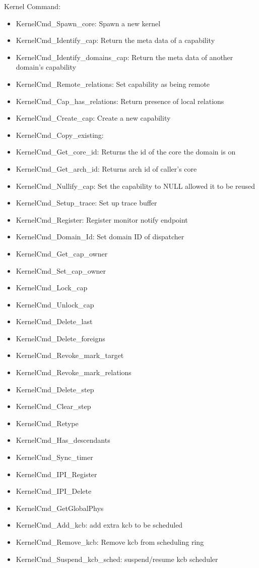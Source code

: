 \documentclass[a4paper,11pt,twoside]{report}
\begin{document}
{{Kernel Command:
\begin{itemize}
\item KernelCmd\_Spawn\_core: Spawn a new kernel
\item KernelCmd\_Identify\_cap: Return the meta data of a capability
\item KernelCmd\_Identify\_domains\_cap: Return the meta data of another domain's capability
\item KernelCmd\_Remote\_relations: Set capability as being remote
\item KernelCmd\_Cap\_has\_relations: Return presence of local relations
\item KernelCmd\_Create\_cap: Create a new capability
\item KernelCmd\_Copy\_existing:
\item KernelCmd\_Get\_core\_id: Returns the id of the core the domain is on
\item KernelCmd\_Get\_arch\_id: Returns arch id of caller's core
\item KernelCmd\_Nullify\_cap: Set the capability to NULL allowed it to be reused
\item KernelCmd\_Setup\_trace: Set up trace buffer
\item KernelCmd\_Register: Register monitor notify endpoint
\item KernelCmd\_Domain\_Id: Set domain ID of dispatcher
\item KernelCmd\_Get\_cap\_owner
\item KernelCmd\_Set\_cap\_owner
\item KernelCmd\_Lock\_cap
\item KernelCmd\_Unlock\_cap
\item KernelCmd\_Delete\_last
\item KernelCmd\_Delete\_foreigns
\item KernelCmd\_Revoke\_mark\_target
\item KernelCmd\_Revoke\_mark\_relations
\item KernelCmd\_Delete\_step
\item KernelCmd\_Clear\_step
\item KernelCmd\_Retype
\item KernelCmd\_Has\_descendants
\item KernelCmd\_Sync\_timer
\item KernelCmd\_IPI\_Register
\item KernelCmd\_IPI\_Delete
\item KernelCmd\_GetGlobalPhys
\item KernelCmd\_Add\_kcb: add extra kcb to be scheduled
\item KernelCmd\_Remove\_kcb: Remove kcb from scheduling ring
\item KernelCmd\_Suspend\_kcb\_sched: suspend/resume kcb scheduler
\end{itemize}

}}
\end{document}
